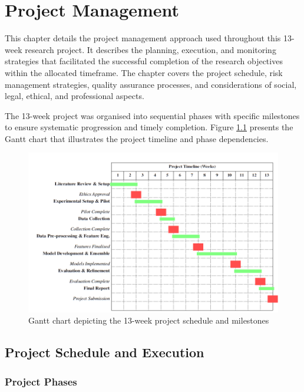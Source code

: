 \chapter{Project Management}

This chapter details the project management approach used throughout this 13-week research project. It describes the planning, execution, and monitoring strategies that facilitated the successful completion of the research objectives within the allocated timeframe. The chapter covers the project schedule, risk management strategies, quality assurance processes, and considerations of social, legal, ethical, and professional aspects.

The 13-week project was organised into sequential phases with specific milestones to ensure systematic progression and timely completion. Figure \ref{fig:gantt_chart} presents the Gantt chart that illustrates the project timeline and phase dependencies.

\begin{figure}[ht]
    \centering
    \includegraphics[width=\textwidth]{images/gantt_chart.png}
    \caption{Gantt chart depicting the 13-week project schedule and milestones}
    \label{fig:gantt_chart}
\end{figure}

\section{Project Schedule and Execution}

\subsection{Project Phases}

